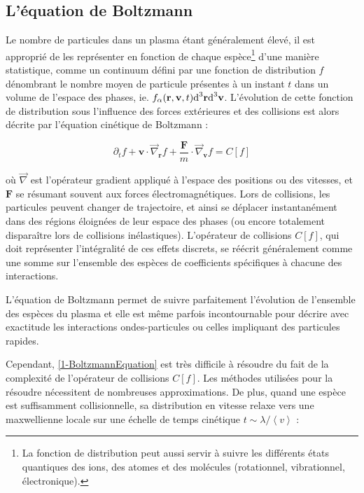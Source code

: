 \begin{refsection}
\subsection{L'équation de Boltzmann}
Le nombre de particules dans un plasma étant généralement élevé, il est
approprié de les représenter en fonction de chaque
espèce\footnote{La fonction de
distribution peut aussi servir à suivre les différents états quantiques des
ions, des atomes et des molécules (rotationnel, vibrationnel, électronique).}
d'une manière statistique, comme un continuum défini par une fonction de
distribution $f$ dénombrant le nombre moyen de particule présentes à un instant
$t$ dans un volume de l'espace des phases, ie. $f_\alpha(\mathbf r,\mathbf
v,t)\text{d}^{{3}}\mathbf r\text{d}^{{3}}\mathbf v$.
L'évolution de cette fonction de distribution sous l'influence des forces
extérieures et des collisions est alors décrite par l'équation cinétique de
Boltzmann :

\begin{equation}
\label{1-BoltzmannEquation}
\partial_tf+\mathbf{v}\cdot\vec\nabla_\mathbf{r}f+
\frac{\mathbf{F}}{m}\cdot\vec\nabla_{\mathbf{v}}f
=C[f]
\end{equation}

où $\vec\nabla$ est l'opérateur gradient appliqué à l'espace des positions ou
des vitesses, et $\mathbf{F}$ se résumant souvent aux forces
électromagnétiques. Lors de collisions, les particules peuvent changer de
trajectoire, et ainsi se déplacer instantanément dans des régions éloignées de leur espace des
phases (ou encore totalement disparaître lors de collisions inélastiques).
L'opérateur de collisions $C[f]$, qui doit représenter l'intégralité de
ces effets discrets, se réécrit généralement comme une somme sur l'ensemble des
espèces de coefficients spécifiques à chacune des interactions.

L'équation de Boltzmann permet de suivre
parfaitement l'évolution de l'ensemble des espèces du plasma et elle est
même parfois incontournable pour décrire avec exactitude les interactions
ondes-particules ou celles impliquant des particules rapides. 

Cependant, \eqref{1-BoltzmannEquation} est très
difficile à résoudre du fait de la complexité de l'opérateur de collisions
$C[f]$. Les méthodes utilisées pour la résoudre nécessitent de nombreuses
approximations\parencite{HagelaarHDR}. De plus, quand une espèce est
suffisamment collisionnelle, sa distribution en vitesse relaxe vers une maxwellienne locale sur une échelle de
temps cinétique $t\sim\lambda/\left<v\right>$ :


\end{refsection}
